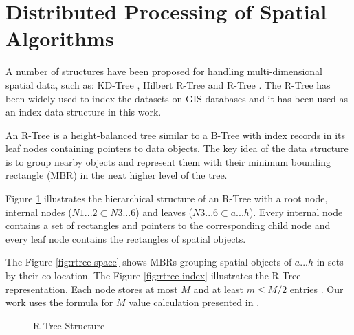 \section{Distributed Processing of Spatial Algorithms}
\label{sec:spatial_dist}		
A number of structures have been proposed for handling multi-dimensional spatial data, such as: 
KD-Tree \cite{bentley1975multidimensional}, Hilbert R-Tree \cite{kamel1994hilbert} and R-Tree \cite{guttman1984r}.
The R-Tree has been widely used to index the datasets on GIS databases and it has been used as an index data structure in this work.

An R-Tree is a height-balanced tree similar to a B-Tree \cite{comer1979ubiquitous} with index records in its leaf nodes containing pointers to data objects. 
The key idea of the data structure is to group nearby objects and represent them with their minimum bounding rectangle (MBR) in the next higher level of the tree. 

Figure \ref{fig:rtree} illustrates the hierarchical structure of an R-Tree with a root node, internal nodes ($N1...2 \subset N3...6$) and leaves ($N3...6 \subset a...h$). 
Every internal node contains a set of rectangles and pointers to the corresponding child node and every leaf node contains the rectangles of spatial objects.

The Figure \ref{fig:rtree-space} shows MBRs grouping spatial objects of $a...h$ in sets by their co-location. 
The Figure \ref{fig:rtree-index} illustrates the R-Tree representation. Each node stores at most $M$ and at least $m \leq M/2$ entries \cite{guttman1984r}. 
Our work uses the formula for $M$ value calculation presented in \cite{dedsi}.

\begin{figure}[h]
  \centering
   \qquad
  \caption{R-Tree Structure}
  \label{fig:rtree}
\end{figure}

